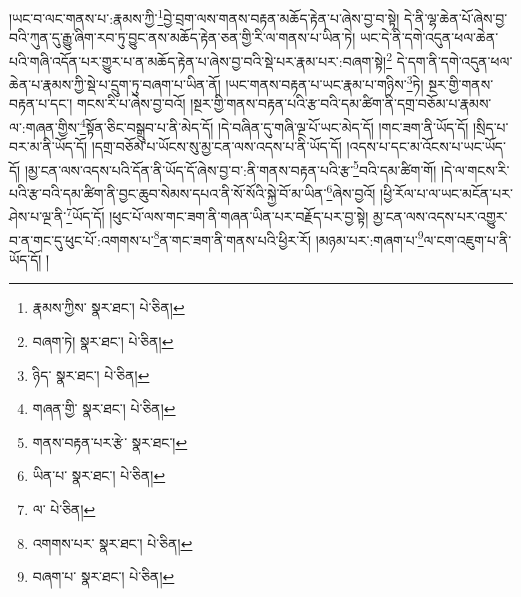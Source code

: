 །ཡང་བ་ལང་གནས་པ་:རྣམས་ཀྱི་\footnote{རྣམས་ཀྱིས་  སྣར་ཐང་།  པེ་ཅིན། }བྱེ་བྲག་ལས་གནས་བརྟན་མཆོད་རྟེན་པ་ཞེས་བྱ་བ་སྟེ། དེ་ནི་ལྷ་ཆེན་པོ་ཞེས་བྱ་བའི་ཀུན་དུ་རྒྱུ་ཞིག་རབ་ཏུ་བྱུང་ནས་མཆོད་རྟེན་ཅན་གྱི་རི་ལ་གནས་པ་ཡིན་ཏེ། ཡང་དེ་ནི་དགེ་འདུན་ཕལ་ཆེན་པའི་གཞི་འདོན་པར་གྱུར་པ་ན་མཆོད་རྟེན་པ་ཞེས་བྱ་བའི་སྡེ་པར་རྣམ་པར་:བཞག་སྟེ།\footnote{བཞག་ཏེ།  སྣར་ཐང་།  པེ་ཅིན། } དེ་དག་ནི་དགེ་འདུན་ཕལ་ཆེན་པ་རྣམས་ཀྱི་སྡེ་པ་དྲུག་ཏུ་བཞག་པ་ཡིན་ནོ། །ཡང་གནས་བརྟན་པ་ཡང་རྣམ་པ་གཉིས་\footnote{ཉིད་  སྣར་ཐང་།  པེ་ཅིན། }ཏེ། སྔར་གྱི་གནས་བརྟན་པ་དང་། གངས་རི་པ་ཞེས་བྱ་བའོ། །སྔར་གྱི་གནས་བརྟན་པའི་རྩ་བའི་དམ་ཚིག་ནི་དགྲ་བཅོམ་པ་རྣམས་ལ་:གཞན་གྱིས་\footnote{གཞན་གྱི་  སྣར་ཐང་།  པེ་ཅིན། }སྟོན་ཅིང་བསྒྲུབ་པ་ནི་མེད་དོ། །དེ་བཞིན་དུ་གཞི་ལྔ་པོ་ཡང་མེད་དོ། །གང་ཟག་ནི་ཡོད་དོ། །སྲིད་པ་བར་མ་ནི་ཡོད་དོ། །དགྲ་བཅོམ་པ་ཡོངས་སུ་མྱ་ངན་ལས་འདས་པ་ནི་ཡོད་དོ། །འདས་པ་དང་མ་འོངས་པ་ཡང་ཡོད་དོ། །མྱ་ངན་ལས་འདས་པའི་དོན་ནི་ཡོད་དོ་ཞེས་བྱ་བ་:ནི་གནས་བརྟན་པའི་རྩ་\footnote{གནས་བརྟན་པར་རྩེ་  སྣར་ཐང་། }བའི་དམ་ཚིག་གོ། །དེ་ལ་གངས་རི་པའི་རྩ་བའི་དམ་ཚིག་ནི་བྱང་ཆུབ་སེམས་དཔའ་ནི་སོ་སོའི་སྐྱེ་བོ་མ་ཡིན་\footnote{ཡིན་པ་  སྣར་ཐང་།  པེ་ཅིན། }ཞེས་བྱའོ། །ཕྱི་རོལ་པ་ལ་ཡང་མངོན་པར་ཤེས་པ་ལྔ་ནི་\footnote{ལ་  པེ་ཅིན། }ཡོད་དོ། །ཕུང་པོ་ལས་གང་ཟག་ནི་གཞན་ཡིན་པར་བརྗོད་པར་བྱ་སྟེ། མྱ་ངན་ལས་འདས་པར་འགྱུར་བ་ན་གང་དུ་ཕུང་པོ་:འགགས་པ་\footnote{འགགས་པར་  སྣར་ཐང་།  པེ་ཅིན། }ན་གང་ཟག་ནི་གནས་པའི་ཕྱིར་རོ། །མཉམ་པར་:གཞག་པ་\footnote{བཞག་པ་  སྣར་ཐང་།  པེ་ཅིན། }ལ་ངག་འཇུག་པ་ནི་ཡོད་དོ། །
